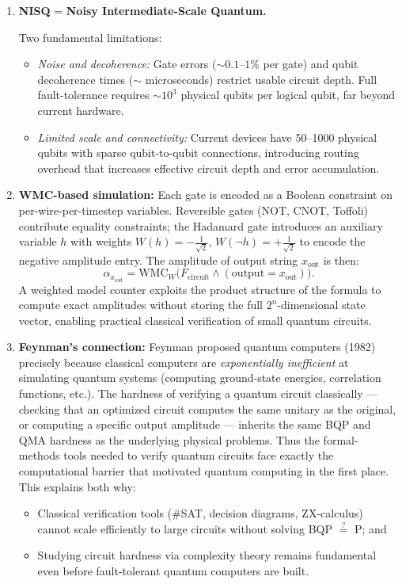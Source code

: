 \documentclass[11pt,a4paper]{article}
\begin{document}
\begin{enumerate}[label=(\roman*)]
  \item \textbf{NISQ} = \textbf{Noisy Intermediate-Scale Quantum.}

    Two fundamental limitations:
    \begin{itemize}
      \item \emph{Noise and decoherence:} Gate errors ($\sim0.1$--$1\%$ per gate) and
        qubit decoherence times ($\sim$ microseconds) restrict usable circuit depth.
        Full fault-tolerance requires $\sim10^3$ physical qubits per logical qubit,
        far beyond current hardware.
      \item \emph{Limited scale and connectivity:} Current devices have 50--1000 physical qubits
        with sparse qubit-to-qubit connections, introducing routing overhead that increases
        effective circuit depth and error accumulation.
    \end{itemize}

  \item \textbf{WMC-based simulation:}
    Each gate is encoded as a Boolean constraint on per-wire-per-timestep variables.
    Reversible gates (NOT, CNOT, Toffoli) contribute equality constraints; the Hadamard
    gate introduces an auxiliary variable $h$ with weights $W(h)=-\tfrac{1}{\sqrt{2}}$,
    $W(\neg h)=+\tfrac{1}{\sqrt{2}}$ to encode the negative amplitude entry.
    The amplitude of output string $x_\text{out}$ is then:
    \[
    \alpha_{x_\text{out}}=\mathrm{WMC}_W\bigl(F_\text{circuit}\land(\text{output}=x_\text{out})\bigr).
    \]
    A weighted model counter exploits the product structure of the formula to compute exact
    amplitudes without storing the full $2^n$-dimensional state vector, enabling practical
    classical verification of small quantum circuits.

  \item \textbf{Feynman's connection:}
    Feynman proposed quantum computers (1982) precisely because classical computers are
    \emph{exponentially inefficient} at simulating quantum systems (computing ground-state
    energies, correlation functions, etc.).
    The hardness of verifying a quantum circuit classically --- checking that an optimized
    circuit computes the same unitary as the original, or computing a specific output amplitude
    --- inherits the same BQP and QMA hardness as the underlying physical problems.
    Thus the formal-methods tools needed to verify quantum circuits face exactly the computational
    barrier that motivated quantum computing in the first place. This explains both why:
    \begin{itemize}
      \item Classical verification tools (\#SAT, decision diagrams, ZX-calculus) cannot scale
        efficiently to large circuits without solving BQP $\stackrel{?}{=}$ P; and
      \item Studying circuit hardness via complexity theory remains fundamental even before
        fault-tolerant quantum computers are built.
    \end{itemize}
\end{enumerate}
\end{document}
